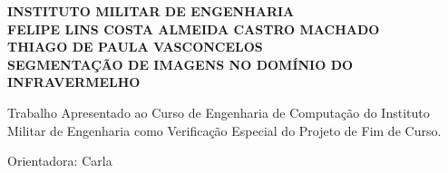 \begin{center}
\large
\textbf{INSTITUTO MILITAR DE ENGENHARIA}\\\vspace{2cm}
\textbf{FELIPE LINS COSTA ALMEIDA CASTRO \textbf{MACHADO}\\
\textbf{THIAGO} DE PAULA \textbf{VASCONCELOS}\\\vspace{4cm}}
\textbf{SEGMENTAÇÃO DE IMAGENS NO DOMÍNIO DO INFRAVERMELHO}\\\vspace{3cm}
\end{center}
\large
\hspace{6cm}\parbox{320px}{Trabalho Apresentado ao Curso de Engenharia
de Computação do Instituto Militar
de Engenharia como Verificação Especial do
Projeto de Fim de Curso.\\}

\vspace{2cm}

\hspace{5.5cm}Orientadora: Carla\\
\setcounter{page}{2}
